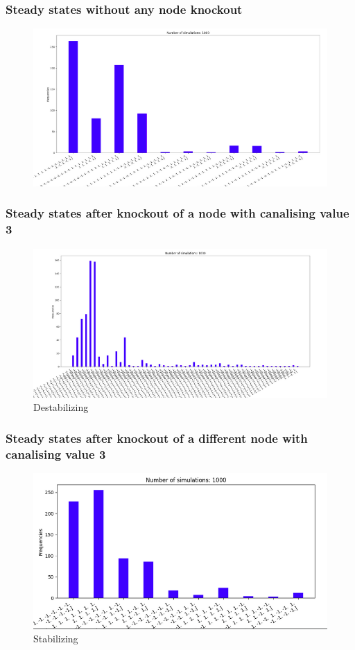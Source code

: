 \documentclass[t]{beamer}
\begin{document}
\begin{frame}
	\frametitle{Steady states without any node knockout}
	\begin{figure}[H]
		\includegraphics[scale=0.3]{img/normalemtracipe.png}
			\end{figure}
\end{frame}

\begin{frame}
	\frametitle{Steady states after knockout of a node with canalising value 3}
	\begin{figure}[H]
		\includegraphics[scale=0.25]{img/nodeknockout.png}
		\caption{Destabilizing}
			\end{figure}
\end{frame}


\begin{frame}
	\frametitle{ Steady states after knockout of a different node with canalising value 3}
	\begin{figure}[H]
		\includegraphics[scale=0.25]{img/node3emtracipe2outcan3incani.png}
		\caption{Stabilizing}
			\end{figure}
\end{frame}
\end{document}
